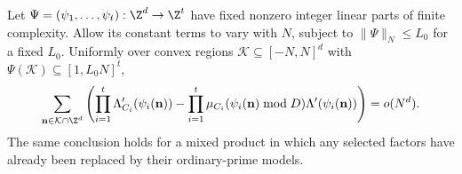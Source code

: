 \begin{lemma}
\label{lem:gaussian-linear-replacement}
Let $\Psi=(\psi_1,\ldots,\psi_t):\Z^d\to\Z^t$ have fixed nonzero integer
linear parts of finite complexity. Allow its constant terms to vary
with $N$, subject to $\|\Psi\|_N\leq L_0$ for a fixed $L_0$.
Uniformly over convex regions $\mathcal K\subseteq[-N,N]^d$ with
$\Psi(\mathcal K)\subseteq[1,L_0N]^t$,
\begin{equation}\label{eq:gaussian-linear-replacement}
 \sum_{\mathbf n\in\mathcal K\cap\Z^d}
 \left(\prod_{i=1}^t\Lambda'_{C_i}(\psi_i(\mathbf n))
 -\prod_{i=1}^t\mu_{C_i}(\psi_i(\mathbf n)\bmod D)
                         \Lambda'(\psi_i(\mathbf n))\right)=o(N^d).
\end{equation}
The same conclusion holds for a mixed product in which any selected
factors have already been replaced by their ordinary-prime models.
\end{lemma}
